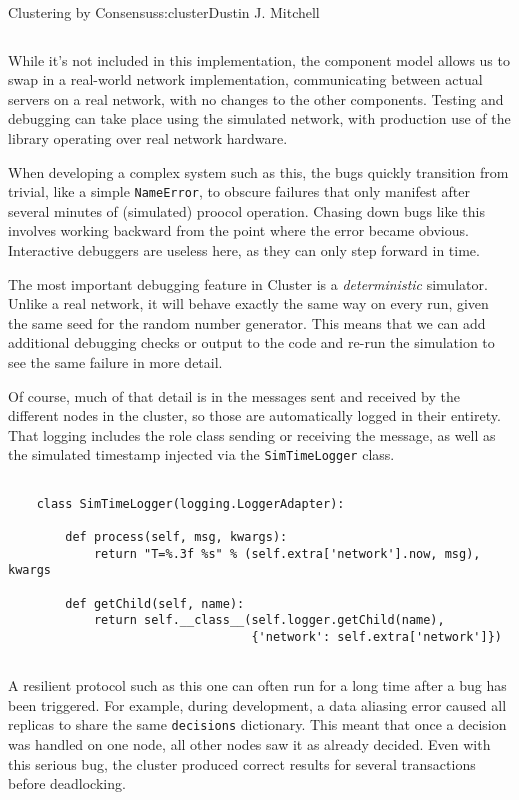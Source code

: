 \begin{aosachapter}{Clustering by Consensus}{s:cluster}{Dustin J. Mitchell}
\begin{verbatim}
\end{verbatim}

While it's not included in this implementation, the component model
allows us to swap in a real-world network implementation, communicating
between actual servers on a real network, with no changes to the other
components. Testing and debugging can take place using the simulated
network, with production use of the library operating over real network
hardware.

\label{debugging-support}

When developing a complex system such as this, the bugs quickly
transition from trivial, like a simple \texttt{NameError}, to obscure
failures that only manifest after several minutes of (simulated) proocol
operation. Chasing down bugs like this involves working backward from
the point where the error became obvious. Interactive debuggers are
useless here, as they can only step forward in time.

The most important debugging feature in Cluster is a
\emph{deterministic} simulator. Unlike a real network, it will behave
exactly the same way on every run, given the same seed for the random
number generator. This means that we can add additional debugging checks
or output to the code and re-run the simulation to see the same failure
in more detail.

Of course, much of that detail is in the messages sent and received by
the different nodes in the cluster, so those are automatically logged in
their entirety. That logging includes the role class sending or
receiving the message, as well as the simulated timestamp injected via
the \texttt{SimTimeLogger} class.

\begin{verbatim}

    class SimTimeLogger(logging.LoggerAdapter):
    
        def process(self, msg, kwargs):
            return "T=%.3f %s" % (self.extra['network'].now, msg), kwargs
    
        def getChild(self, name):
            return self.__class__(self.logger.getChild(name),
                                  {'network': self.extra['network']})
    
\end{verbatim}

A resilient protocol such as this one can often run for a long time
after a bug has been triggered. For example, during development, a data
aliasing error caused all replicas to share the same \texttt{decisions}
dictionary. This meant that once a decision was handled on one node, all
other nodes saw it as already decided. Even with this serious bug, the
cluster produced correct results for several transactions before
deadlocking.


\end{aosachapter}
